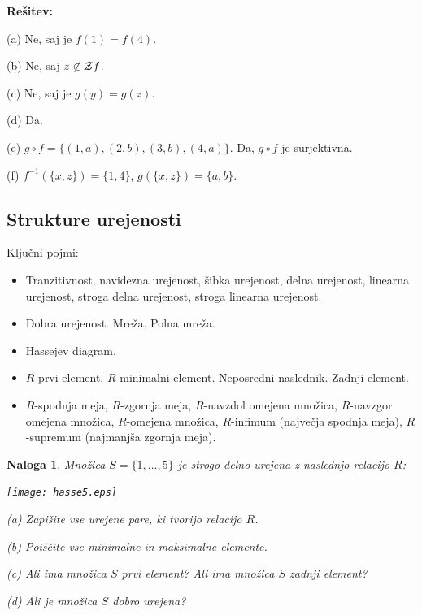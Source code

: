 \documentclass[11pt,paper=b5,footinclude,headinclude]{scrbook} %
\newtheorem*{problem}{Naloga}
\begin{document}
\textbf{Rešitev:}

(a) Ne, saj je $f(1) = f(4)$.

(b) Ne, saj $z\not\in{\cal Z} f$.

(c) Ne, saj je $g(y) = g(z)$.

(d) Da.

(e) $g\circ f = \{(1,a), (2,b), (3,b), (4,a)\}$. Da, $g\circ f$ je surjektivna.

(f) $f^{-1}(\{x,z\}) = \{1,4\}$, $g(\{x,z\}) = \{a,b\}$.
%
%
%
%

\subsection{Strukture urejenosti}
Ključni pojmi:
\begin{itemize}
\item Tranzitivnost, navidezna urejenost, šibka urejenost, delna urejenost,
linearna urejenost, stroga delna urejenost, stroga linearna urejenost.
\item Dobra urejenost. Mreža. Polna mreža.
\item Hassejev diagram.
\item $R$-prvi element. $R$-minimalni element. Neposredni naslednik. Zadnji element.
\item $R$-spodnja meja, $R$-zgornja meja, $R$-navzdol omejena množica, $R$-navzgor omejena
množica, $R$-omejena množica, $R$-infimum (največja spodnja meja),
$R$-supremum (najmanjša zgornja meja).
\end{itemize}

\begin{problem}
Množica $S=\{1,\ldots,5\}$ je strogo delno urejena z naslednjo relacijo $R$:
\begin{center}
\texttt{[image: hasse5.eps]}
\end{center}

(a) Zapišite vse urejene pare, ki tvorijo relacijo $R$.

(b) Poiščite vse minimalne in maksimalne elemente.

(c) Ali ima množica $S$ prvi element? Ali ima množica $S$ zadnji element?

(d) Ali je množica $S$ dobro urejena?
\end{problem}
\end{document}

